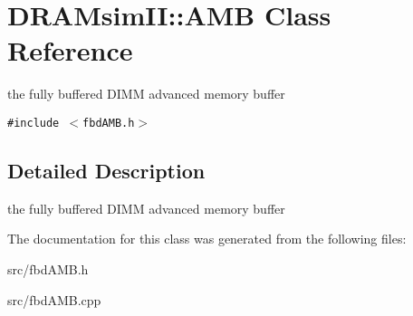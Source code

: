 \section{DRAMsimII::AMB Class Reference}
\label{class_d_r_a_msim_i_i_1_1_a_m_b}
the fully buffered DIMM advanced memory buffer  


{\tt \#include $<$fbdAMB.h$>$}



\subsection{Detailed Description}
the fully buffered DIMM advanced memory buffer 

The documentation for this class was generated from the following files:\begin{CompactItemize}
\item 
src/fbdAMB.h\item 
src/fbdAMB.cpp\end{CompactItemize}
